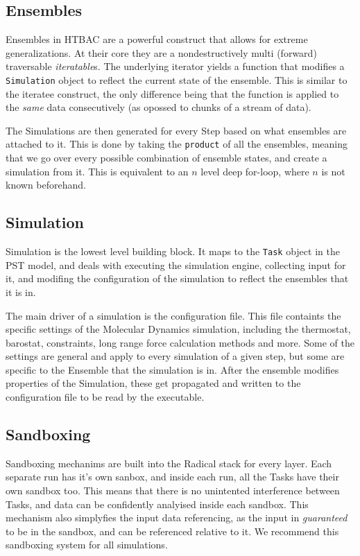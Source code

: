 \subsection{Ensembles}

Ensembles in HTBAC are a powerful construct that allows for extreme generalizations. At their core they are a nondestructively multi (forward) traversable \emph{iteratable}s. The underlying iterator yields a function that modifies a \texttt{Simulation} object to reflect the current state of the ensemble. This is similar to the iteratee construct, the only difference being that the function is applied to the \emph{same} data consecutively (as opossed to chunks of a stream of data).

The Simulations are then generated for every Step based on what ensembles are attached to it. This is done by taking the \texttt{product} of all the ensembles, meaning that we go over every possible combination of ensemble states, and create a simulation from it. This is equivalent to an $n$ level deep for-loop, where $n$ is not known beforehand.

\subsection{Simulation}

Simulation is the lowest level building block. It maps to the \texttt{Task} object in the PST model, and deals with executing the simulation engine, collecting input for it, and modifing the configuration of the simulation to reflect the ensembles that it is in.

The main driver of a simulation is the configuration file. This file containts the specific settings of the Molecular Dynamics simulation, including the thermostat, barostat, constraints, long range force calculation methods and more. Some of the settings are general and apply to every simulation of a given step, but some are specific to the Ensemble that the simulation is in. After the ensemble modifies properties of the Simulation, these get propagated and written to the configuration file to be read by the executable.

\subsection{Sandboxing}

Sandboxing mechanims are built into the Radical stack for every layer. Each separate run has it's own sanbox, and inside each run, all the Tasks have their own sandbox too. This means that there is no unintented interference between Tasks, and data can be confidently analyised inside each sandbox. This mechanism also simplyfies the input data referencing, as the input in \emph{guaranteed} to be in the sandbox, and can be referenced relative to it. We recommend this sandboxing system for all simulations.

